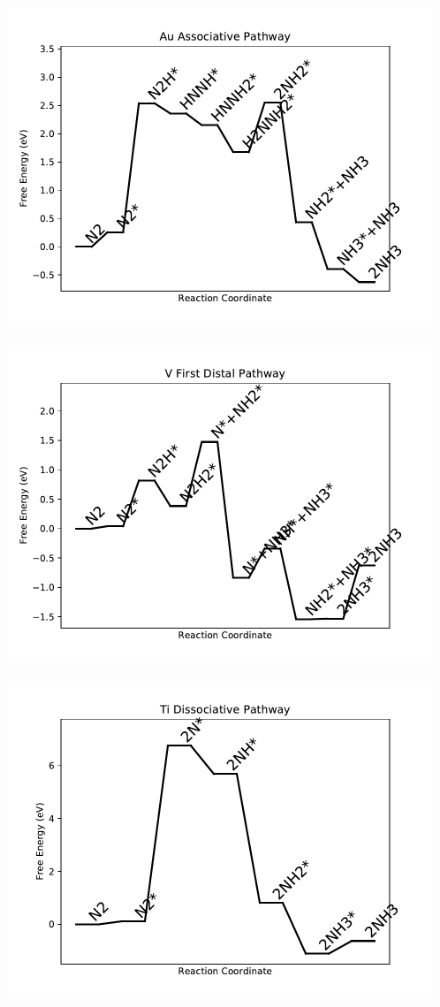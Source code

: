 \begin{figure}
\includegraphics[width=0.8\linewidth]{data/plots/Au_associative.pdf}
\end{figure}

\begin{figure}
\includegraphics[width=0.8\linewidth]{data/plots/V_distal_1.pdf}
\end{figure}

\begin{figure}
\includegraphics[width=0.8\linewidth]{data/plots/Ti_dissociative.pdf}
\end{figure}

